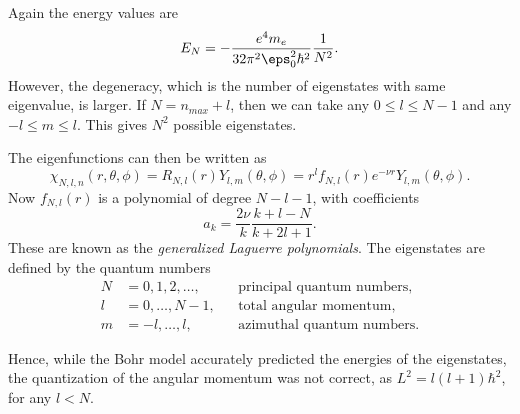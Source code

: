 \documentclass[12pt]{article}
\begin{document}
Again the energy values are
\[
E_N = - \frac{e^{4}m_e}{32 \pi^2 \eps_0^2\hbar^2} \frac{1}{N^2}
.\]
However, the degeneracy, which is the number of eigenstates with same eigenvalue, is larger. If $N = n_{max} + l$, then we can take any $0 \leq l \leq N-1$ and any $-l \leq m \leq l$. This gives $N^2$ possible eigenstates.

The eigenfunctions can then be written as
\[
	\chi_{N,l,n}(r, \theta, \phi) = R_{N,l}(r)Y_{l, m}(\theta, \phi) = r^{l}f_{N,l}(r)e^{-\nu r} Y_{l,m}(\theta, \phi)
.\]
Now $f_{N,l}(r)$ is a polynomial of degree $N - l - 1$, with coefficients
\[
	a_k = \frac{2\nu}{k} \frac{k + l - N}{k + 2l + 1}
.\]
These are known as the \textit{generalized Laguerre polynomials}. The eigenstates are defined by the quantum numbers
\begin{align*}
	N &= 0, 1, 2, \ldots, & &\text{principal quantum numbers}, \\
	l &= 0, \ldots, N-1, & &\text{total angular momentum}, \\
	m &= -l, \ldots, l, & &\text{azimuthal quantum numbers}.
\end{align*}

Hence, while the Bohr model accurately predicted the energies of the eigenstates, the quantization of the angular momentum was not correct, as $L^2 = l(l+1)\hbar^2$, for any $l < N$.
\newpage

\printindex
\end{document}
